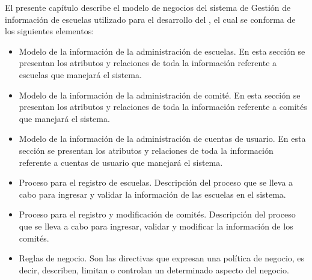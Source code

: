 El presente capítulo describe el modelo de negocios del sistema de Gestión de información de escuelas utilizado para el desarrollo del {\bf \varProyecto}, el cual se conforma de los siguientes elementos:

\begin{itemize}
    \item Modelo de la información de la administración de escuelas. En esta sección se presentan los atributos y relaciones de toda la información referente a escuelas que manejará el sistema.
    
    \item Modelo de la información de la administración de comité. En esta sección se presentan los atributos y relaciones de toda la información referente a comités que manejará el sistema.
    
    \item Modelo de la información de la administración de cuentas de usuario. En esta sección se presentan los atributos y relaciones de toda la información referente a cuentas de usuario que manejará el sistema.
    
    \item Proceso para el registro de escuelas. Descripción del proceso que se lleva a cabo para ingresar y validar la información de las escuelas en el sistema.
    
    \item Proceso para el registro y modificación de comités. Descripción del proceso que se lleva a cabo para ingresar, validar y modificar la información de los comités.
    
    \item Reglas de negocio. Son las directivas que expresan una política de negocio, es decir, describen, limitan o controlan un determinado aspecto del negocio.\\
\end{itemize}


